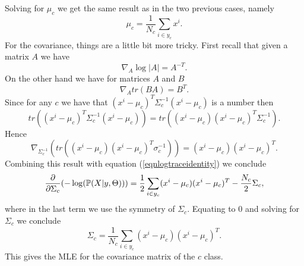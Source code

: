 \documentclass{article}
\begin{document}
Solving for $\mu_{c}$ we get the same result as in the two previous cases, namely 
\begin{equation*}
\mu_{c}=\frac{1}{N_{c}}\sum_{i\in y_{c}}x^{i}.
\end{equation*}
For the covariance, things are a little bit more tricky. First recall that given a matrix $A$ we have
\begin{equation}\label{eqnlogtraceidentity}
\nabla_{A}\log|A|=A^{-T}.
\end{equation}
On the other hand we have for matrices $A$ and $B$
\begin{equation*}
\nabla_{A}tr(BA)=B^{T}.
\end{equation*}
Since for any $c$ we have that $(x^{i}-\mu_{c})^{T}\Sigma_{c}^{-1}(x^{i}-\mu_{c})$ is a number then
\begin{equation*}
tr((x^{i}-\mu_{c})^{T}\Sigma_{c}^{-1}(x^{i}-\mu_{c}))=tr((x^{i}-\mu_{c})(x^{i}-\mu_{c})^{T}\Sigma_{c}^{-1}).
\end{equation*}
Hence
\begin{equation*}
\nabla_{\Sigma_{c}^{-1}}(tr((x^{i}-\mu_{c})(x^{i}-\mu_{c})^{T}\sigma_{c}^{-1}))=(x^{i}-\mu_{c})(x^{i}-\mu_{c})^{T}.
\end{equation*}
Combining this result with equation (\ref{eqnlogtraceidentity}) we conclude
\begin{equation*}
\frac{\partial}{\partial\Sigma_{c}}(-\log(\mathbb{P}(X|y,\Theta)))=\frac{1}{2}\sum_{i\in y_{c}}(x^{i}-\mu_{c})(x^{i}-\mu_{c})^{T}-\frac{N_{c}}{2}\Sigma_{c},
\end{equation*}
where in the last term we use the symmetry of $\Sigma_{c}$. Equating to $0$ and solving for $\Sigma_{c}$ we conclude
\begin{equation*}
\Sigma_{c}=\frac{1}{N_{c}}\sum_{i\in y_{c}}(x^{i}-\mu_{c})(x^{i}-\mu_{c})^{T}.
\end{equation*}
This gives the MLE for the covariance matrix of the $c$ class.
\newline
\end{document}
